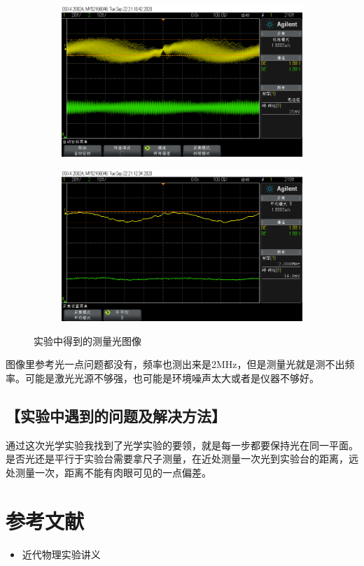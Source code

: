 \documentclass{ctexart}
\let\oldsubsection\subsection
\renewcommand{\subsection}[1]{\oldsubsection{\!\!\!\!\!\!【#1】}}
\begin{document}
\begin{figure}[H]
  \centering
  \begin{subfigure}{.48\textwidth}
    \centering
    \includegraphics[width=\linewidth]{双频激光干涉装置图像/测量光和参考光1}
  \end{subfigure}
  \begin{subfigure}{.48\textwidth}
    \centering
    \includegraphics[width=\linewidth]{双频激光干涉装置图像/测量光和参考光2}
  \end{subfigure}
  \caption{实验中得到的测量光图像}
\end{figure}

图像里参考光一点问题都没有，频率也测出来是2MHz，但是测量光就是测不出频率。可能是激光光源不够强，也可能是环境噪声太大或者是仪器不够好。

\subsection{实验中遇到的问题及解决方法}

通过这次光学实验我找到了光学实验的要领，就是每一步都要保持光在同一平面。是否光还是平行于实验台需要拿尺子测量，在近处测量一次光到实验台的距离，远处测量一次，距离不能有肉眼可见的一点偏差。

\section{参考文献}
\begin{itemize}[leftmargin=0pt]
  \item[] 近代物理实验讲义
\end{itemize}
\end{document}
